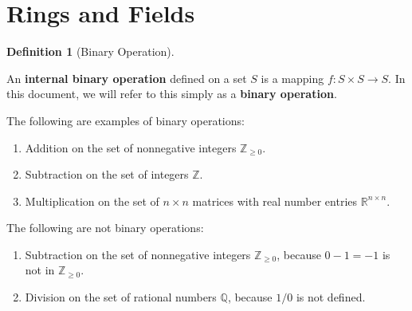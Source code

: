 \documentclass{scrartcl}
\theoremstyle{definition}
\newtheorem{definition}{Definition}[section]
\theoremstyle{plain}
\theoremstyle{remark}
\begin{document}
\section{Rings and Fields}

\begin{definition}[Binary Operation]
    \label{def:binary operation}

    \newcommand{\Q}{\mathbb{Q}}
    \newcommand{\R}{\mathbb{R}}
    \newcommand{\Z}{\mathbb{Z}}

    An \textbf{internal binary operation} defined on a set $S$ is a mapping $f:S\times S\to S$.
    In this document, we will refer to this simply as a \textbf{binary operation}.

    The following are examples of binary operations:
    \begin{enumerate}
        \item Addition on the set of nonnegative integers $\Z_{\geq 0}$.
        \item Subtraction on the set of integers $\Z$.
        \item Multiplication on the set of $n\times n$ matrices with real number entries $\R^{n\times n}$.
    \end{enumerate}

    The following are not binary operations:
    \begin{enumerate}
        \item Subtraction on the set of nonnegative integers $\Z_{\geq 0}$, because $0-1=-1$ is not in $\Z_{\geq 0}$.
        \item Division on the set of rational numbers $\Q$, because $1/0$ is not defined.
    \end{enumerate}
\end{definition}
\end{document}
